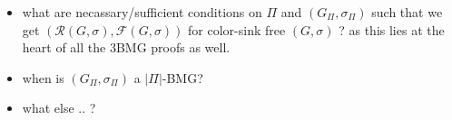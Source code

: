 \documentclass[final,3p,times]{elsarticle}
\newtheorem{lemma}[theorem]{Lemma}%
\newcommand{\TODO}[1]{\begingroup\color{red}#1\endgroup}
\begin{document}

%      
%      
%  
%  
%      
%      
%      






\TODO{\smallskip
\begin{itemize}
\item what are necassary/sufficient conditions on $\Pi$ and $(G_{\Pi},\sigma_{\Pi})$
such that we get $(\mathscr{R}(G,\sigma),\mathscr{F}(G,\sigma))$ for color-sink free $(G,\sigma)$
? as this lies at the heart of all the 3BMG proofs as well. 

\item when is  $(G_{\Pi},\sigma_{\Pi})$ a $|\Pi|$-BMG?

\item what else .. ?

\end{itemize}
}



















\end{document}
